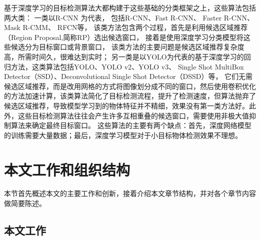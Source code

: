 基于深度学习的目标检测算法大都构建于这些基础的分类框架之上，这些算法包括两大类：
一类以R-CNN\cite{girshick2014rich}
为代表，
包括R-CNN\cite{girshick2014rich}、Fast R-CNN\cite{girshick2015fast}、
Faster R-CNN\cite{ren2015faster}、Mask R-CMM\cite{he2017mask}、
RFCN\cite{dai2016r}等，
该类方法包含两个过程，首先是利用候选区域推荐（Region Proposal,简称RP）选出候选窗口，
接着是使用深度学习分类模型将这些候选分为目标窗口或背景窗口，
该类方法的主要问题是候选区域推荐复杂度高，所需时间久，很难达到实时；
另一类是以YOLO\cite{redmon2016you}为代表的基于深度学习的回归方法，这类算法包括YOLO、YOLO v2\cite{redmon2016yolo9000}、YOLO v3\cite{yolov3}、
Single Shot MultiBox Detector\cite{liu2016ssd}（SSD）、Deconvolutional Single Shot Detector\cite{fu2017dssd}（DSSD）等，
它们无需候选区域推荐，而是改用网格的方式将图像划分成不同的窗口，然后使用卷积优化的方法加速计算，该类算法简化了目标检测流程，提升了检测速度，但算法抛弃了候选区域推荐，导致模型学习到的物体特征并不精细，效果没有第一类方法好。此外，这些目标检测算法往往会产生许多互相重叠的候选窗口，需要使用非极大值抑制算法来确定最终目标窗口。
这些算法的主要有两个缺点：首先，深度网络模型的训练需要大量数据；最后，深度学习模型对于小目标物体检测效果不理想。

\section{本文工作和组织结构}

本节首先概述本文的主要工作和创新，接着介绍本文章节结构，并对各个章节内容做简要陈述。

\subsection{本文工作}

